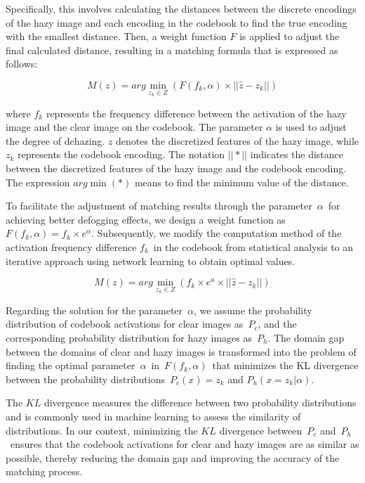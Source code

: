 \documentclass[journal]{IEEEtran}
\begin{document}
Specifically, this involves calculating the distances between the discrete encodings of the hazy image and each encoding in the codebook to find the true encoding with the smallest distance. Then, a weight function $F$ is applied to adjust the final calculated distance, resulting in a matching formula that is expressed as follows:

\begin{equation}
	\label{codebook_matching_equation_2}
	M(z) = arg \min_{z_{k} \in Z} (F(f_{k}, \alpha) \times || \widehat{z} - z_{k} ||)
\end{equation}

\noindent where $f_{k}$ represents the frequency difference between the activation of the hazy image and the clear image on the codebook. The parameter $ \alpha $ is used to adjust the degree of dehazing. $z$ denotes the discretized features of the hazy image, while $z_{k}$ represents the codebook encoding. The notation $||*||$ indicates the distance between the discretized features of the hazy image and the codebook encoding. The expression $arg \min(*)$ means to find the minimum value of the distance.


To facilitate the adjustment of matching results through the parameter $\alpha$ for achieving better defogging effects, we design a weight function as $F(f_{k}, \alpha) = f_{k} \times e^{\alpha} $. Subsequently, we modify the computation method of the activation frequency difference $f_{k}$ in the codebook from statistical analysis to an iterative approach using network learning to obtain optimal values.

\begin{equation}
	\label{codebook_matching_equation_1}
	M(z) = arg \min_{z_{k} \in Z} (f_{k} \times e^{a} \times || \widehat{z} - z_{k} ||)
\end{equation}

Regarding the solution for the parameter $\alpha$, we assume the probability distribution of codebook activations for clear images as $P_{c}$, and the corresponding probability distribution for hazy images as $P_{h}$. The domain gap between the domains of clear and hazy images is transformed into the problem of finding the optimal parameter $\alpha$ in $F(f_{k}, \alpha)$ that minimizes the KL divergence between the probability distributions $P_{c}(x) = z_{k}$ and $P_{h}(x = z_{k} | \alpha) $.


The $KL$ divergence measures the difference between two probability distributions and is commonly used in machine learning to assess the similarity of distributions. In our context, minimizing the $KL$ divergence between $P_{c}$ and $P_{h}$ ensures that the codebook activations for clear and hazy images are as similar as possible, thereby reducing the domain gap and improving the accuracy of the matching process.
\end{document}
